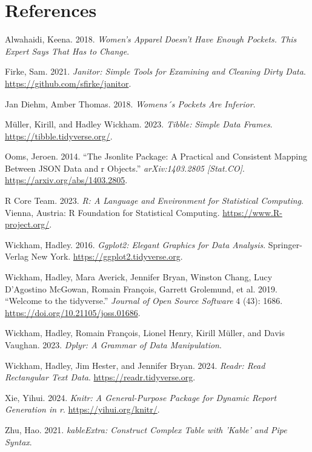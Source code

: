 \documentclass[
  letterpaper,
  DIV=11,
  numbers=noendperiod]{scrartcl}
\newlength{\cslhangindent}
\newlength{\cslentryspacingunit} %
\newenvironment{CSLReferences}[2] %
 {%
  \setlength{\parindent}{0pt}
  \ifodd #1
  \let\oldpar\par
  \def\par{\hangindent=\cslhangindent\oldpar}
  \fi
  \setlength{\parskip}{#2\cslentryspacingunit}
 }%
 {}
\begin{document}
\newpage

\hypertarget{references}{%
\section*{References}\label{references}}

\hypertarget{refs}{}
\begin{CSLReferences}{1}{0}
\leavevmode{}%
Alwahaidi, Keena. 2018. \emph{Women's Apparel Doesn't Have Enough
Pockets. This Expert Says That Has to Change}.

\leavevmode{}%
Firke, Sam. 2021. \emph{Janitor: Simple Tools for Examining and Cleaning
Dirty Data}. \url{https://github.com/sfirke/janitor}.

\leavevmode{}%
Jan Diehm, Amber Thomas. 2018. \emph{Womens´s Pockets Are Inferior}.

\leavevmode{}%
Müller, Kirill, and Hadley Wickham. 2023. \emph{Tibble: Simple Data
Frames}. \url{https://tibble.tidyverse.org/}.

\leavevmode{}%
Ooms, Jeroen. 2014. {``The Jsonlite Package: A Practical and Consistent
Mapping Between JSON Data and r Objects.''} \emph{arXiv:1403.2805
{[}Stat.CO{]}}. \url{https://arxiv.org/abs/1403.2805}.

\leavevmode{}%
R Core Team. 2023. \emph{R: A Language and Environment for Statistical
Computing}. Vienna, Austria: R Foundation for Statistical Computing.
\url{https://www.R-project.org/}.

\leavevmode{}%
Wickham, Hadley. 2016. \emph{Ggplot2: Elegant Graphics for Data
Analysis}. Springer-Verlag New York.
\url{https://ggplot2.tidyverse.org}.

\leavevmode{}%
Wickham, Hadley, Mara Averick, Jennifer Bryan, Winston Chang, Lucy
D'Agostino McGowan, Romain François, Garrett Grolemund, et al. 2019.
{``Welcome to the {tidyverse}.''} \emph{Journal of Open Source Software}
4 (43): 1686. \url{https://doi.org/10.21105/joss.01686}.

\leavevmode{}%
Wickham, Hadley, Romain François, Lionel Henry, Kirill Müller, and Davis
Vaughan. 2023. \emph{Dplyr: A Grammar of Data Manipulation}.

\leavevmode{}%
Wickham, Hadley, Jim Hester, and Jennifer Bryan. 2024. \emph{Readr: Read
Rectangular Text Data}. \url{https://readr.tidyverse.org}.

\leavevmode{}%
Xie, Yihui. 2024. \emph{Knitr: A General-Purpose Package for Dynamic
Report Generation in r}. \url{https://yihui.org/knitr/}.

\leavevmode{}%
Zhu, Hao. 2021. \emph{kableExtra: Construct Complex Table with 'Kable'
and Pipe Syntax}.

\end{CSLReferences}
\end{document}
